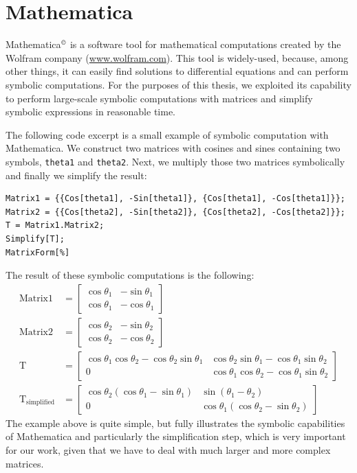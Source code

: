 \section{Mathematica}
Mathematica$^{\textrm{\copyright}}$ is a software tool for mathematical computations created by the Wolfram company (\url{www.wolfram.com}). This tool is widely-used, because, among other things, it can easily find solutions to differential equations and can perform symbolic computations. For the purposes of this thesis, we exploited its capability to perform large-scale symbolic computations with matrices and simplify symbolic expressions in reasonable time.

The following code excerpt is a small example of symbolic computation with Mathematica. We construct two matrices with cosines and sines containing two symbols, {\tt theta1} and {\tt theta2}. Next, we multiply those two matrices symbolically and finally we simplify the result:

\begin{small}
\begin{verbatim}
Matrix1 = {{Cos[theta1], -Sin[theta1]}, {Cos[theta1], -Cos[theta1]}};
Matrix2 = {{Cos[theta2], -Sin[theta2]}, {Cos[theta2], -Cos[theta2]}};
T = Matrix1.Matrix2;
Simplify[T];
MatrixForm[%]
\end{verbatim}
\end{small}

\noindent
The result of these symbolic computations is the following:
\begin{align*}
\text{Matrix1} &= \begin{bmatrix}
\cos\theta_1 & -\sin\theta_1\\
\cos\theta_1 & -\cos\theta_1
\end{bmatrix}\\
\text{Matrix2} &= \begin{bmatrix}
\cos\theta_2 & -\sin\theta_2\\
\cos\theta_2 & -\cos\theta_2
\end{bmatrix}\\
\text{T} &= \begin{bmatrix}
\cos\theta_1\cos\theta_2 - \cos\theta_2\sin\theta_1 &   \cos\theta_2 \sin\theta_1 - \cos\theta_1 \sin\theta_2\\
0 & \cos\theta_1 \cos\theta_2 - \cos\theta_1 \sin\theta_2
\end{bmatrix}\\
\text{T}_{\text{simplified}} &= \begin{bmatrix}
\cos\theta_2\left(\cos\theta_1 - \sin\theta_1\right) & \sin\left(\theta_1 - \theta_2\right)\\
 0 & \cos\theta_1 \left(\cos\theta_2 - \sin\theta_2\right)
\end{bmatrix}
\end{align*}
The example above is quite simple, but fully illustrates the symbolic capabilities of Mathematica and particularly the simplification step, which is very important for our work, given that we have to deal with much larger and more complex matrices.